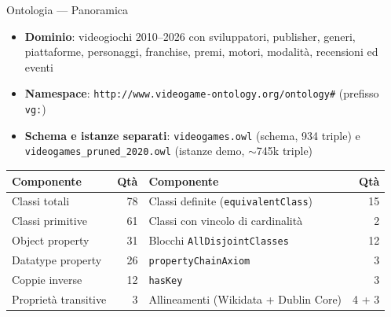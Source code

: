 \documentclass[aspectratio=169,11pt]{beamer}
\begin{document}
\begin{frame}{Ontologia --- Panoramica}
  \begin{itemize}\small
    \item \textbf{Dominio}: videogiochi 2010--2026 con sviluppatori, publisher, generi,
      piattaforme, personaggi, franchise, premi, motori, modalit\`a, recensioni ed eventi
    \item \textbf{Namespace}: \texttt{http://www.videogame-ontology.org/ontology\#} (prefisso \texttt{vg:})
    \item \textbf{Schema e istanze separati}: \texttt{videogames.owl} (schema, 934 triple) e
      \texttt{videogames\_pruned\_2020.owl} (istanze demo, $\sim$745k triple)
  \end{itemize}

  \vspace{2pt}

  \begin{table}
  \centering\small
  \begin{tabular}{@{}lrlr@{}}
    \toprule
    \textbf{Componente} & \textbf{Qt\`a} & \textbf{Componente} & \textbf{Qt\`a} \\
    \midrule
    Classi totali            & 78  & Classi definite (\texttt{equivalentClass}) & 15 \\
    Classi primitive         & 61  & Classi con vincolo di cardinalit\`a         & 2  \\
    Object property          & 31  & Blocchi \texttt{AllDisjointClasses}         & 12 \\
    Datatype property        & 26  & \texttt{propertyChainAxiom}                 & 3  \\
    Coppie inverse           & 12  & \texttt{hasKey}                             & 3  \\
    Propriet\`a transitive   & 3   & Allineamenti (Wikidata + Dublin Core)       & 4 + 3 \\
    \bottomrule
  \end{tabular}
  \end{table}
\end{frame}
\end{document}
